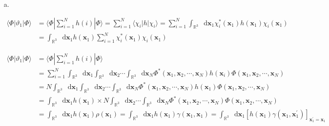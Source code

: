 \documentclass[a4paper]{book}
\newcommand*{\dif}{\mathop{}\!\mathrm{d}}
\begin{document}
	\begin{solution}
	
	\begin{itemize}
	
	\item[a.]
	
	\begin{align*}
		\langle \Phi | \vartheta_1 | \Phi \rangle &= \langle \Phi | \sum_{ i=1 }^N h(i) | \Phi \rangle = \sum_{ i=1 }^N \langle \chi_i | h | \chi_i \rangle = \sum_{ i=1 }^N \int_{ \mathbb{R}^3 } \dif \boldsymbol{x}_1 \chi^*_i( \boldsymbol{x}_1 ) h( \boldsymbol{x}_1 ) \chi_i( \boldsymbol{x}_1 )  \\
		&=\int_{ \mathbb{R}^3 } \dif \boldsymbol{x}_1  h( \boldsymbol{x}_1 ) \sum_{ i=1 }^N \chi^*_i( \boldsymbol{x}_1 ) \chi_i( \boldsymbol{x}_1 )
	\end{align*}
	
	\begin{align*}
		\langle \Phi | \vartheta_1 | \Phi \rangle &= \langle \Phi | \sum_{ i=1 }^N h(i) | \Phi \rangle \\
		&= \sum_{ i=1 }^N \int_{ \mathbb{R}^3 } \dif \boldsymbol{x}_1 \int_{ \mathbb{R}^3 } \dif \boldsymbol{x}_2 \cdots \int_{ \mathbb{R}^3 } \dif \boldsymbol{x}_N \Phi^*( \boldsymbol{x}_1, \boldsymbol{x}_2, \cdots , \boldsymbol{x}_N ) h( \boldsymbol{x}_i ) \Phi( \boldsymbol{x}_1, \boldsymbol{x}_2, \cdots , \boldsymbol{x}_N ) \\
		&= N \int_{ \mathbb{R}^3 } \dif \boldsymbol{x}_1 \int_{ \mathbb{R}^3 } \dif \boldsymbol{x}_2 \cdots \int_{ \mathbb{R}^3 } \dif \boldsymbol{x}_N \Phi^*( \boldsymbol{x}_1, \boldsymbol{x}_2, \cdots , \boldsymbol{x}_N ) h( \boldsymbol{x}_1 ) \Phi( \boldsymbol{x}_1, \boldsymbol{x}_2, \cdots , \boldsymbol{x}_N ) \\
		&= \int_{ \mathbb{R}^3 } \dif \boldsymbol{x}_1 h( \boldsymbol{x}_1 ) \times N \int_{ \mathbb{R}^3 } \dif \boldsymbol{x}_2 \cdots \int_{ \mathbb{R}^3 } \dif \boldsymbol{x}_N \Phi^*( \boldsymbol{x}_1, \boldsymbol{x}_2, \cdots , \boldsymbol{x}_N ) \Phi( \boldsymbol{x}_1, \boldsymbol{x}_2, \cdots , \boldsymbol{x}_N ) \\
		&= \int_{ \mathbb{R}^3 } \dif \boldsymbol{x}_1 h( \boldsymbol{x}_1 ) \rho( \boldsymbol{x}_1 ) = \int_{ \mathbb{R}^3 } \dif \boldsymbol{x}_1 h( \boldsymbol{x}_1 ) \gamma( \boldsymbol{x}_1 , \boldsymbol{x}_1 ) = \int_{ \mathbb{R}^3 } \dif \boldsymbol{x}_1 \left[ h( \boldsymbol{x}_1 ) \gamma( \boldsymbol{x}_1 , \boldsymbol{x}^\prime_1 ) \right]_{ \boldsymbol{x}^\prime_1 = \boldsymbol{x}_1 }
	\end{align*}
	

\end{itemize}
\end{solution}
\end{document}
